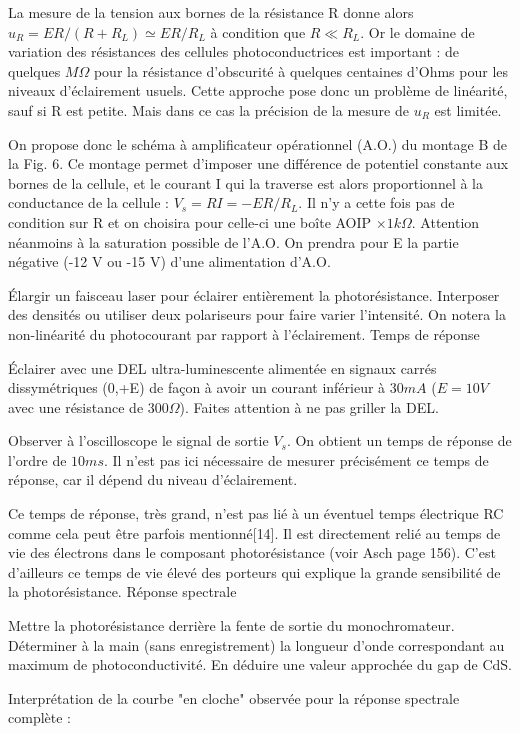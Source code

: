 \documentclass{article}%
\begin{document}
La mesure de la tension aux bornes de la résistance R donne alors $u_R=ER/(R+R_L) \simeq ER/R_L$ à condition que $R\ll R_L$. Or le domaine de variation des résistances des cellules photoconductrices est important : de quelques $M \Omega$ pour la résistance d'obscurité à quelques centaines d'Ohms pour les niveaux d'éclairement usuels. Cette approche pose donc un problème de linéarité, sauf si R est petite. Mais dans ce cas la précision de la mesure de $u_R$ est limitée.

On propose donc le schéma à amplificateur opérationnel (A.O.) du montage B de la Fig. 6. Ce montage permet d'imposer une différence de potentiel constante aux bornes de la cellule, et le courant I qui la traverse est alors proportionnel à la conductance de la cellule : $V_s=RI=-ER/R_L$. Il n'y a cette fois pas de condition sur R et on choisira pour celle-ci une boîte AOIP $\times 1 k\Omega$. Attention néanmoins à la saturation possible de l'A.O. On prendra pour E la partie négative (-12 V ou -15 V) d'une alimentation d'A.O.

Élargir un faisceau laser pour éclairer entièrement la photorésistance. Interposer des densités ou utiliser deux polariseurs pour faire varier l'intensité. On notera la non-linéarité du photocourant par rapport à l'éclairement.
Temps de réponse

Éclairer avec une DEL ultra-luminescente alimentée en signaux carrés dissymétriques (0,+E) de façon à avoir un courant inférieur à $30 mA$ ($E=10 V$ avec une résistance de $300 \Omega$). Faites attention à ne pas griller la DEL.

Observer à l'oscilloscope le signal de sortie $V_{s}$. On obtient un temps de réponse de l'ordre de $10 ms$. Il n'est pas ici nécessaire de mesurer précisément ce temps de réponse, car il dépend du niveau d'éclairement.

Ce temps de réponse, très grand, n'est pas lié à un éventuel temps électrique RC comme cela peut être parfois mentionné[14]. Il est directement relié au temps de vie des électrons dans le composant photorésistance (voir Asch page 156). C'est d'ailleurs ce temps de vie élevé des porteurs qui explique la grande sensibilité de la photorésistance.
Réponse spectrale

Mettre la photorésistance derrière la fente de sortie du monochromateur. Déterminer à la main (sans enregistrement) la longueur d'onde correspondant au maximum de photoconductivité. En déduire une valeur approchée du gap de CdS.

Interprétation de la courbe "en cloche" observée pour la réponse spectrale complète :
\end{document}
